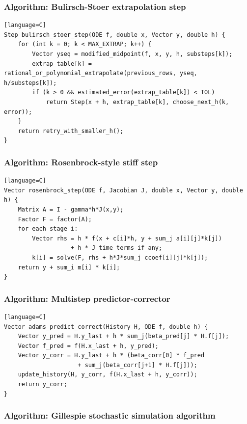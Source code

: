 \documentclass[11pt]{article}
\begin{document}
\subsubsection{Algorithm: Bulirsch-Stoer extrapolation step}\label{algorithm-bulirsch-stoer-extrapolation-step}

\begin{verbatim}[language=C]
Step bulirsch_stoer_step(ODE f, double x, Vector y, double h) {
    for (int k = 0; k < MAX_EXTRAP; k++) {
        Vector yseq = modified_midpoint(f, x, y, h, substeps[k]);
        extrap_table[k] = rational_or_polynomial_extrapolate(previous_rows, yseq, h/substeps[k]);
        if (k > 0 && estimated_error(extrap_table[k]) < TOL)
            return Step(x + h, extrap_table[k], choose_next_h(k, error));
    }
    return retry_with_smaller_h();
}
\end{verbatim}

\subsubsection{Algorithm: Rosenbrock-style stiff step}\label{algorithm-rosenbrock-style-stiff-step}

\begin{verbatim}[language=C]
Vector rosenbrock_step(ODE f, Jacobian J, double x, Vector y, double h) {
    Matrix A = I - gamma*h*J(x,y);
    Factor F = factor(A);
    for each stage i:
        Vector rhs = h * f(x + c[i]*h, y + sum_j a[i][j]*k[j])
                   + h * J_time_terms_if_any;
        k[i] = solve(F, rhs + h*J*sum_j ccoef[i][j]*k[j]);
    return y + sum_i m[i] * k[i];
}
\end{verbatim}

\subsubsection{Algorithm: Multistep predictor-corrector}\label{algorithm-multistep-predictor-corrector}

\begin{verbatim}[language=C]
Vector adams_predict_correct(History H, ODE f, double h) {
    Vector y_pred = H.y_last + h * sum_j(beta_pred[j] * H.f[j]);
    Vector f_pred = f(H.x_last + h, y_pred);
    Vector y_corr = H.y_last + h * (beta_corr[0] * f_pred
                     + sum_j(beta_corr[j+1] * H.f[j]));
    update_history(H, y_corr, f(H.x_last + h, y_corr));
    return y_corr;
}
\end{verbatim}

\subsubsection{Algorithm: Gillespie stochastic simulation algorithm}\label{algorithm-gillespie-stochastic-simulation-algorithm}
\end{document}
